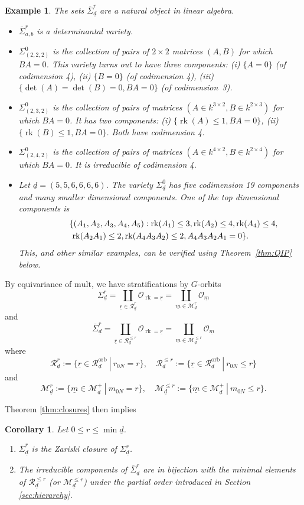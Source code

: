 \documentclass[a4paper]{amsart}
\DeclareMathOperator{\rk}{rk}
\newcommand{\CO}{\mathcal{O}}
\newcommand{\CR}{\mathcal{R}}
\newcommand{\CM}{\mathcal{M}}
\newcommand{\ur}{\underline{r}}
\newcommand{\um}{\underline{m}}
\newcommand{\ud}{\underline{d}}
\newcommand{\orb}{\mathrm{orb}}
\newcommand{\mult}{\mathrm{mult}}
\newcommand{\cSigma}{\overline{\Sigma}}
\newtheorem{cor}[thm]{Corollary}
\theoremstyle{plain}
\newtheorem{example}[thm]{Example}
\begin{document}
\begin{example} \rm \label{ex:222324}
 The sets $\cSigma^r_{\ud}$ are a natural object in linear algebra.
 \begin{itemize}
     \item $\cSigma^r_{a,b}$ is a \emph{determinantal variety}.
     \item $\Sigma^0_{(2,2,2)}$ is the collection of pairs of $2\times 2$ matrices $(A,B)$ for which $BA=0$. This variety turns out to have three components: (i) $\{A=0\}$ (of codimension 4), (ii) $\{B=0\}$ (of codimension 4), (iii) $\{\det(A)=\det(B)=0,BA=0\}$ (of codimension~3).
     \item $\Sigma^0_{(2,3,2)}$ is the collection of pairs of matrices $(A\in k^{3\times 2},B\in k^{2\times 3})$ for which $BA=0$. It has two components: (i) $\{\rk(A)\leq 1, BA=0\}$, (ii) $\{\rk(B)\leq 1, BA=0\}$. Both have codimension 4.
     \item  $\Sigma^0_{(2,4,2)}$ is the collection of pairs of matrices $(A\in k^{4\times 2},B\in k^{2\times 4})$ for which $BA=0$. It is irreducible of codimension 4.
     \item Let $\ud=(5,5,6,6,6,6)$. The variety $\Sigma^0_{\ud}$ has five codimension 19 components and many smaller dimensional components. One of the top dimensional components is 
     \begin{multline*}
        \ \hskip 1 true cm \{(A_1,A_2,A_3,A_4,A_5): \rk(A_1)\leq 3, \rk(A_2)\leq 4,\rk(A_4)\leq 4,\\ 
          \rk(A_2A_1)\leq 2,\rk(A_4A_3A_2)\leq 2,A_4A_3A_2A_1=0\}.
      \end{multline*}
      This, and other similar examples, can be verified using Theorem~\ref{thm:QIP} below. 
     \end{itemize}
\end{example}

By equivariance of $\mult$, we have stratifications by $G$-orbits
\[
\Sigma^r_{\ud}=\coprod_{\ur\in \CR_{\ud}^r}\CO_{\rk=\ur}=\coprod_{\um\in \CM_{\ud}^r}\CO_{\um}
\]
and
\[
\cSigma^r_{\ud}=\coprod_{\ur\in \CR_{\ud}^{\leq r}}\CO_{\rk=\ur}=\coprod_{\um\in \CM_{\ud}^{\leq r}}\CO_{\um}
\]
where
\[
\CR_{\ud}^{r}:=\{\ur\in \CR^\orb_{\ud}\ |\ r_{0N}= r\},\quad \CR_{\ud}^{\leq r}:=\{\ur\in \CR^\orb_{\ud}\ |\ r_{0N}\leq r\}
\]
and 
\[
\CM_{\ud}^r:=\{\um\in \CM^+_{\ud}\ |\ m_{0N}=r\},\quad\CM_{\ud}^{\leq r}:=\{\um\in \CM^+_{\ud}\ |\ m_{0N}\leq r\}.
\]

Theorem \ref{thm:closures} then implies

\begin{cor}\label{cor:irred_comp}
Let $0\leq r\leq \min\ud$.
\begin{enumerate}[label=(\alph*)]
    \item $\cSigma^r_{\ud}$ is the Zariski closure of $\Sigma^r_{\ud}$.
    \item The irreducible components of $\cSigma^r_{\ud}$ are in bijection with the minimal elements of $\CR_{\ud}^{\leq r}$ (or $\CM_{\ud}^{\leq r}$) under the partial order introduced in Section \ref{sec:hierarchy}.
\end{enumerate}
\end{cor}
\end{document}
